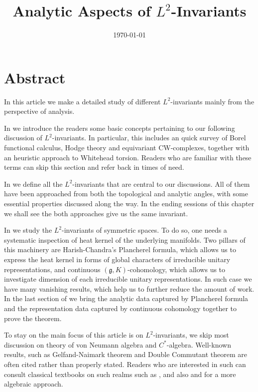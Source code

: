 \documentclass[11pt]{report}
\date{\today}
\title{Analytic Aspects of $L^2$-Invariants}
\theoremstyle{definition}
\theoremstyle{plain}
\newcommand{\Lie}[1]{\mathfrak{#1}}
\begin{document}
	\setlength{\parskip}{.3em}
	\maketitle
	\tableofcontents
	\chapter*{Abstract}
	In this article we make a detailed study of different $L^2$-invariants mainly from the perspective of analysis. 
	\par In  we introduce the readers some basic concepts pertaining to our following discussion of $L^2$-invariants. In particular, this includes an quick survey of Borel functional calculus, Hodge theory and equivariant CW-complexes, together with an heuristic approach to Whitehead torsion. Readers who are familiar with these terms can skip this section and refer back in times of need.
	\par In  we define all the $L^2$-invariants that are central to our discussions. All of them have been approached from both the topological and analytic angles, with some essential properties discussed along the way. In the ending sessions of this chapter we shall see the both approaches give us the same invariant.
	\par In  we study the $L^2$-invariants of symmetric spaces. To do so, one needs a systematic inspection of heat kernel of the underlying manifolds. Two pillars of this machinery are Harish-Chandra's Plancherel formula, which allows us to express the heat kernel in forms of global characters of irreducible unitary representations, and continuous $(\Lie{g}, K)$-cohomology, which allows us to investigate dimension of each irreducible unitary representations. In such case we have many vanishing results, which help us to further reduce the amount of work. In the last section of  we bring the analytic data captured by Plancherel formula and the representation data captured by continuous cohomology together to prove the theorem.
	\par To stay on the main focus of this article is on $L^2$-invariants, we skip most discussion on theory of von Neumann algebra and $C^*$-algebra. Well-known results, such as Gelfand-Naimark theorem and Double Commutant theorem are often cited rather than properly stated. Readers who are interested in such can consult classical textbooks on such realms such as \cite{conway2013}, and also \cite{murphy2014} and \cite{dixmier1982} for a more algebraic approach.
	
\end{document}

